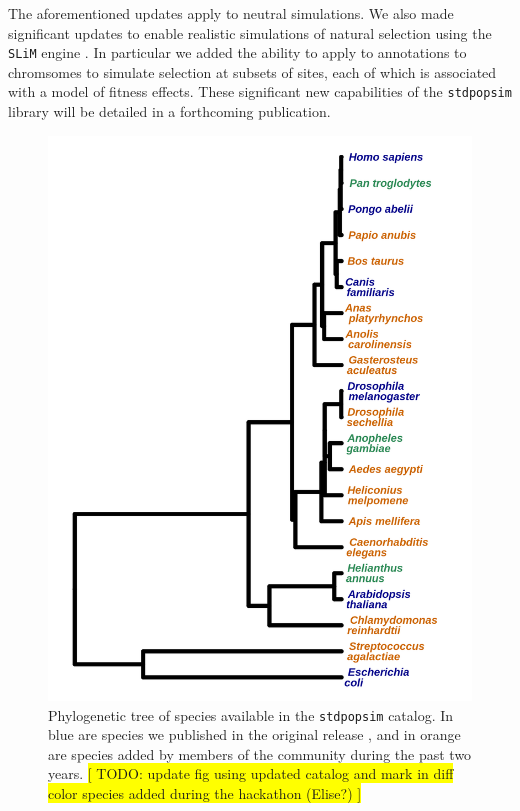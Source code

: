\documentclass[hidelinks]{article}
\newcommand{\stdpopsim}{\texttt{stdpopsim}\xspace}
\begin{document}
The aforementioned updates apply to neutral simulations.
We also made significant updates to enable realistic simulations of natural selection
using the \texttt{SLiM} engine \citep{Haller2019}. In particular we added the ability to
apply to annotations to chromsomes to simulate selection at subsets of sites,
each of which is associated with a model of fitness effects.
These significant new capabilities of the \stdpopsim library will be detailed in a forthcoming publication.

\begin{figure}
	\includegraphics[width=\linewidth]{./figs/species_fig.png}
	\caption{Phylogenetic tree of species available in the \stdpopsim catalog.
		In blue are species we published in the original release \citep{Adrion2020}, and in orange are species added by members of the community during the past two years.
		\colorbox{yellow}{[ TODO: update fig using updated catalog and mark in diff color species added during the hackathon (Elise?) ]}
		\color{red}{Names are cutoff on right hand side of figure}}
	\label{fig:tree}
\end{figure}
\end{document}
